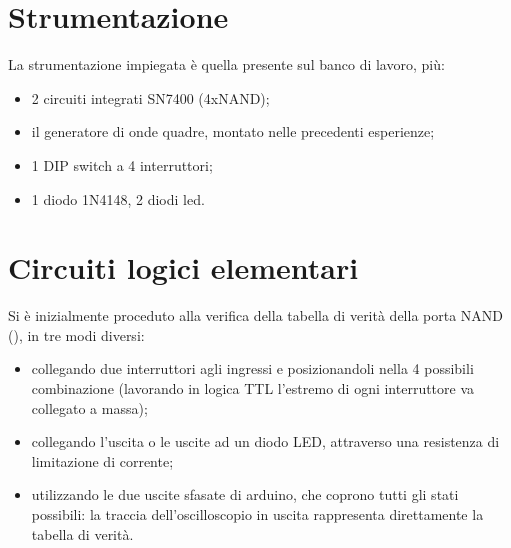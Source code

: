 \section{Strumentazione}
La strumentazione impiegata è quella presente sul banco di lavoro, più:
	\begin{itemize}
		\item 2 circuiti integrati SN7400 (4xNAND);
		\item il generatore di onde quadre, montato nelle precedenti esperienze;
		\item 1 DIP switch a 4 interruttori;
		\item 1 diodo 1N4148, 2 diodi led.
	\end{itemize}

\section{Circuiti logici elementari}
Si è inizialmente proceduto alla verifica della tabella di verità della porta NAND (), in tre modi diversi:
\begin{itemize}
	\item collegando due interruttori agli ingressi e posizionandoli nella 4 possibili combinazione (lavorando in logica TTL l'estremo di ogni interruttore va collegato a massa);
	\item collegando l’uscita o le uscite ad un diodo LED, attraverso una resistenza di limitazione di corrente;
	\item utilizzando le due uscite	sfasate di arduino, che coprono tutti gli stati possibili: la traccia dell’oscilloscopio
	in uscita rappresenta direttamente la tabella di verità.
\end{itemize}
	

